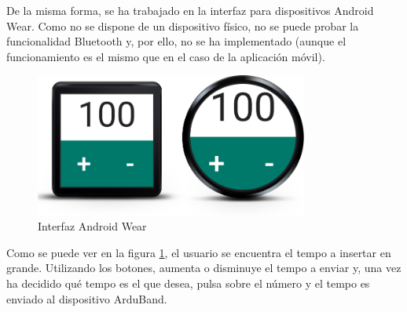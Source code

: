 De la misma forma, se ha trabajado en la interfaz para dispositivos Android Wear.
Como no se dispone de un dispositivo físico, no se puede probar la funcionalidad
Bluetooth y, por ello, no se ha implementado (aunque el funcionamiento es el mismo que
en el caso de la aplicación móvil).\\

\begin{figure}[!htb]
\centering
\includegraphics[width=0.8\textwidth]{./imagenes/androidwear}
\caption{Interfaz Android Wear} \label{fig:androidwearUI}
\end{figure}

Como se puede ver en la figura \ref{fig:androidwearUI}, el usuario se encuentra el
tempo a insertar en grande. Utilizando los botones, aumenta o disminuye el tempo a
enviar y, una vez ha decidido qué tempo es el que desea, pulsa sobre el número y
el tempo es enviado al dispositivo ArduBand.\\
